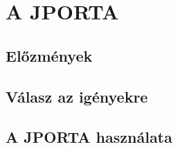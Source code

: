 \chapter{A JPORTA}\label{chapter:jporta}

\section{Előzmények}

\section{Válasz az igényekre}

\section{A JPORTA használata}
